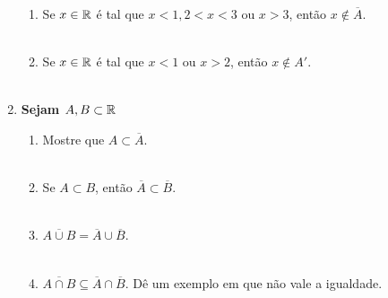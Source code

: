 \documentclass[%
  a4paper,%
  12pt,%
  fleqn,%
  english,%
  brazilian,%
]{article}
\begin{document}
\begin{enumerate}[wide, labelwidth=!, labelindent=0pt]
	\begin{enumerate}[label=\alph*)]
		\item Se $x \in \mathbb R$ é tal que $x<1, 2<x<3$ ou $x>3$, então $x \not \in \overline{A}$.\\
		\\
		\newpage
		\item Se $x \in \mathbb R$ é tal que $x<1$ ou $x>2$, então $x \not \in A'$.\\
		\\
	\end{enumerate}
	\item \textbf{Sejam $A, B \subset \mathbb R$}
	\begin{enumerate}[label=\alph*)]
		\item Mostre que $A \subset \overline{A}$.\\
		\\
		\item Se $A \subset B$, então $\overline{A} \subset \overline{B}$.\\
		\\
		\item $\overline{A \cup B} = \overline{A} \cup \overline{B}$.\\
		\\
		\item $\overline{A \cap B}\subseteq\overline{A}\cap\overline{B}$. Dê um exemplo em que não vale a igualdade.\\
	\end{enumerate}
\end{enumerate}
\end{document}
